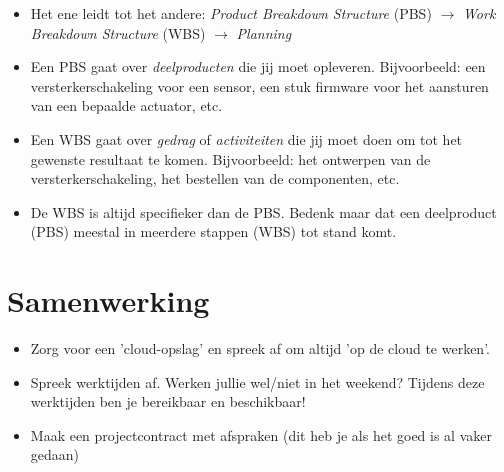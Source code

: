 \documentclass[24pt,a4paper]{article}
\begin{document}
\begin{itemize}
      \item Het ene leidt tot het andere: \textit{Product Breakdown Structure} (PBS) \textbf{$\rightarrow$} \textit{Work Breakdown Structure} (WBS)
            $\rightarrow$ \textit{Planning}
      \item Een PBS gaat over \textit{deelproducten} die jij moet opleveren. Bijvoorbeeld: een versterkerschakeling voor een sensor, een stuk firmware voor het aansturen van een bepaalde actuator, etc.
      \item Een WBS gaat over \textit{gedrag} of \textit{activiteiten} die jij moet doen om tot het gewenste resultaat te komen. Bijvoorbeeld: het ontwerpen van de versterkerschakeling, het bestellen van de componenten, etc.
      \item De WBS is altijd specifieker dan de PBS. Bedenk maar dat een deelproduct (PBS) meestal in meerdere stappen (WBS) tot stand komt.
\end{itemize}

\section{Samenwerking}
\begin{itemize}
      \mssep
      \item Zorg voor een 'cloud-opslag' en spreek af om altijd 'op de cloud te werken'.
      \item Spreek werktijden af. Werken jullie wel/niet in het weekend? Tijdens deze werktijden ben je bereikbaar en beschikbaar!
      \item Maak een projectcontract met afspraken (dit heb je als het goed is al vaker gedaan)
\end{itemize}
\end{document}

